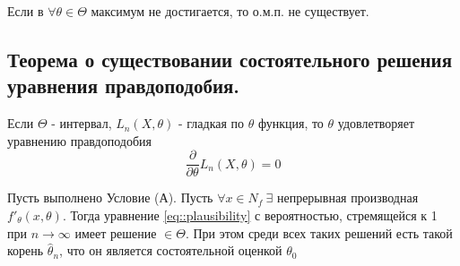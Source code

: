 Если в \(\forall\theta\in\Theta\) максимум не достигается, то о.м.п. не существует.

\newpage
\subsection{Теорема о существовании состоятельного решения уравнения правдоподобия.}

Если \(\Theta\) - интервал, \(L_n(X, \theta)\) - гладкая по \(\theta\) функция,
то \(\theta\) удовлетворяет уравнению правдоподобия
\begin{equation} \label{eq::plausibility}
    \frac{\partial}{\partial\theta}L_n(X, \theta) = 0
\end{equation}
\begin{theorem}
    \label{th::consist_plausibility}
    Пусть выполнено Условие (А). Пусть \(\forall x \in N_f \ \exists\) непрерывная
    производная \(f'_{\theta}(x, \theta)\). Тогда уравнение \eqref{eq::plausibility}
    с вероятностью, стремящейся к 1 при \(n\rightarrow \infty\) имеет решение \(\in\Theta\).
    При этом среди всех таких решений есть такой корень \(\widehat{\theta}_n\), что он
    является состоятельной оценкой \(\theta_0\)
\end{theorem}
